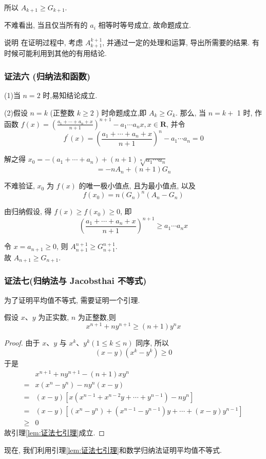 所以 $A_{k+1} \geqslant G_{k+1}$.

不难看出, 当且仅当所有的 $a_{i}$ 相等时等号成立, 故命题成立.

说明 在证明过程中, 考虑 $A_{k+1}^{k+1}$, 并通过一定的处理和运算, 导出所需要的结果. 有时候可能利用到其他的有用结论.

\subsubsection*{证法六 (归纳法和函数)}

(1)当 $n=2$ 时,易知结论成立.

(2)假设 $n=k$ (正整数 $k \geqslant 2$ ) 时命题成立,即 $A_{k} \geqslant G_{k}$. 那么, 当 $n=k+$ 1 时, 作函数 $f(x)=\left(\frac{a_{1}+\cdots+a_{n}+x}{n+1}\right)^{n+1}-a_{1} \cdots a_{n} x, x \in \mathbf{R}$, 并令
$$
f^{\prime}(x)=\left(\frac{a_{1}+\cdots+a_{n}+x}{n+1}\right)^{n}-a_{1} \cdots a_{n}=0
$$

解之得 $x_{0}=-\left(a_{1}+\cdots+a_{n}\right)+(n+1) \sqrt[n]{a_{1} \cdots a_{n}}$
$$
=-n A_{n}+(n+1) G_{n}
$$

不难验证, $x_{0}$ 为 $f(x)$ 的唯一极小值点, 且为最小值点, 以及
$$
f\left(x_{0}\right)=n\left(G_{n}\right)^{n}\left(A_{n}-G_{n}\right)
$$

由归纳假设, 得 $f(x) \geqslant f\left(x_{0}\right) \geqslant 0$, 即
$$
\left(\frac{a_{1}+\cdots+a_{n}+x}{n+1}\right)^{n+1} \geqslant a_{1} \cdots a_{n} x
$$

令 $x=a_{n+1} \geqslant 0$, 则 $A_{n+1}^{n+1} \geqslant G_{n+1}^{n+1}$.\\
故 $A_{n+1} \geqslant G_{n+1}$.

\subsubsection*{证法七(归纳法与 Jacobsthai 不等式)}

为了证明平均值不等式, 需要证明一个引理.

\begin{lemma}\label{lem:证法七引理}
假设 $x 、 y$ 为正实数, $n$ 为正整数,则
$$
x^{n+1}+n y^{n+1} \geqslant(n+1) y^{n} x
$$
\end{lemma}
\begin{proof}
由于 $x 、 y$ 与 $x^{k} 、 y^{k}(1 \leqslant k \leqslant n)$ 同序, 所以
$$
(x-y)\left(x^{k}-y^{k}\right) \geqslant 0
$$
于是
$$
\begin{aligned}
& x^{n+1}+n y^{n+1}-(n+1) x y^{n} \\
= & x\left(x^{n}-y^{n}\right)-n y^{n}(x-y) \\
= & (x-y)\left[x\left(x^{n-1}+x^{n-2} y+\cdots+y^{n-1}\right)-n y^{n}\right] \\
= & (x-y)\left[\left(x^{n}-y^{n}\right)+\left(x^{n-1}-y^{n-1}\right) y+\cdots+(x-y) y^{n-1}\right] \\
\geqslant & 0
\end{aligned}
$$
故引理\ref{lem:证法七引理}成立. 
\end{proof}
现在, 我们利用引理\ref{lem:证法七引理}和数学归纳法证明平均值不等式.

